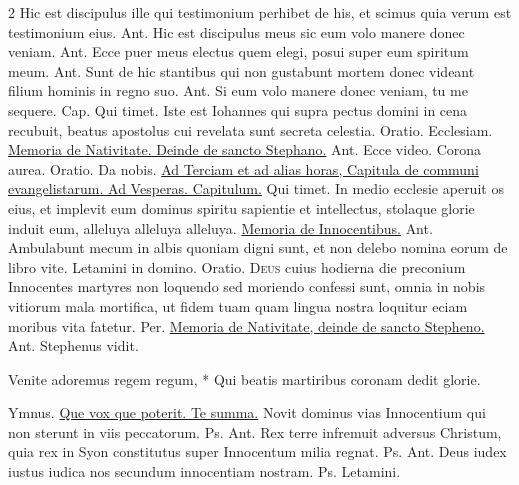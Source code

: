 \begin{multicols*}{2}
 Hic est discipulus ille qui testimonium perhibet de his, et scimus quia verum est testimonium eius. {\color{Red} Ant.} Hic est discipulus meus sic eum volo manere donec veniam. {\color{Red} Ant.} Ecce puer meus electus quem elegi, posui super eum spiritum meum. {\color{Red} Ant.} Sunt de hic stantibus qui non gustabunt mortem donec videant filium hominis in regno suo. {\color{Red} Ant.} Si eum volo manere donec veniam, tu me sequere. {\color{Red} Cap.} Qui timet.
 Iste est Iohannes qui supra pectus domini in cena recubuit, beatus apostolus cui revelata sunt secreta celestia. {\color{Red} Oratio.} Ecclesiam. \ul{Memoria de Nativitate. Deinde de sancto Stephano.} {\color{Red} Ant.} Ecce video. \V Corona aurea. {\color{Red} Oratio.} Da nobis.
\newline \ul{Ad Terciam et ad alias horas, Capitula de communi evangelistarum. Ad Vesperas. Capitulum.} Qui timet.
 In medio ecclesie aperuit os eius, et implevit eum dominus spiritu sapientie et intellectus, stolaque glorie induit eum, alleluya alleluya alleluya.
\newline \ul{Memoria de Innocentibus.} {\color{Red} Ant.} Ambulabunt mecum in albis quoniam digni sunt, et non delebo nomina eorum de libro vite. \V Letamini in domino. {\color{Red} Oratio.}
\lettrine[lines=2]{\zallmancaps \color{Blue} D}{eus} cuius hodierna die preconium Innocentes martyres non loquendo sed moriendo confessi sunt, omnia in nobis vitiorum mala mortifica, ut fidem tuam quam lingua nostra loquitur eciam moribus vita fatetur. Per.
\newline \ul{Memoria de Nativitate, deinde de sancto Stepheno.} {\color{Red} Ant.} Stephenus vidit.
{\color{Red} }
\begin{invitatory}
{Venite adoremus regem regum, * Qui beatis martiribus coronam dedit glorie.}
\end{invitatory}
{\color{Red} Ymnus.} \hyperlink{que-vox-que-poterit}{Que vox que poterit. Te summa.}
 Novit dominus vias Innocentium qui non sterunt in viis peccatorum. {\color{Red} Ps.}  {\color{Red} Ant.} Rex terre infremuit adversus Christum, quia rex in Syon constitutus super Innocentum milia regnat. {\color{Red} Ps.}  {\color{Red} Ant.} Deus iudex iustus iudica nos secundum innocentiam nostram. {\color{Red} Ps.}  \V Letamini.

\end{multicols*}
